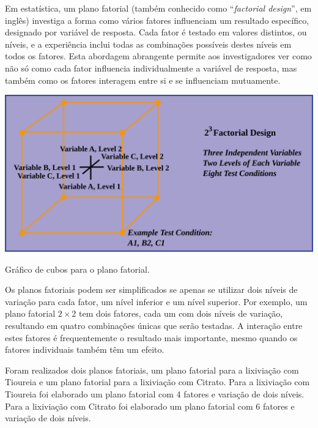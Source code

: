 
Em estatística, um plano fatorial (também conhecido como ``\emph{factorial design}'', em inglês) investiga a forma como vários fatores influenciam um resultado específico, designado por variável de resposta.
Cada fator é testado em valores distintos, ou níveis, e a experiência inclui todas as combinações possíveis destes níveis em todos os fatores.
Esta abordagem abrangente permite aos investigadores ver como não só como cada fator influencia individualmente a variável de resposta, mas também como os fatores interagem entre si e se influenciam mutuamente.

\begin{marginfigure}
    \includegraphics[width=\linewidth]{figures/plano fatorial exemplo}
    \caption{Gráfico de cubos para o plano fatorial.}
    \label{fig:plano_fatorial_exemplo}
\end{marginfigure}

Os planos fatoriais podem ser simplificados se apenas se utilizar dois níveis de variação para cada fator, um nível inferior e um nível superior. 
Por exemplo, um plano fatorial $2\times2$ tem dois fatores, cada um com dois níveis de variação, resultando em quatro combinações únicas que serão testadas.
A interação entre estes fatores é frequentemente o resultado mais importante, mesmo quando os fatores individuais também têm um efeito.

Foram realizados dois planos fatoriais, um plano fatorial para a lixiviação com Tioureia e um plano fatorial para a lixiviação com Citrato.
Para a lixiviação com Tioureia foi elaborado um plano fatorial com 4 fatores e variação de dois níveis.
Para a lixiviação com Citrato foi elaborado um plano fatorial com 6 fatores e variação de dois níveis.

